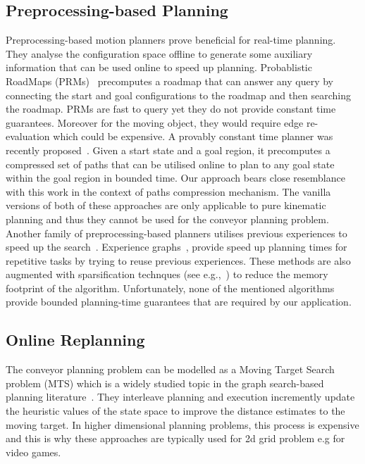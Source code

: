 \documentclass[conference]{IEEEtran}
\begin{document}
\subsection{Preprocessing-based Planning}
Preprocessing-based motion planners prove beneficial for real-time planning. They analyse the configuration space offline to generate some auxiliary information that can be used online to speed up planning. Probablistic RoadMaps (PRMs)~\cite{kavraki1996probabilistic} precomputes a roadmap that can answer any query by connecting the start and goal configurations to the roadmap and then searching the roadmap. PRMs are fast to query yet they do not provide constant time guarantees.
Moreover for the moving object, they would require edge re-evaluation which could be expensive.
%
A provably constant time planner was recently proposed~\cite{islam2019planning}. Given a start state and a goal region, it precomputes a compressed set of paths that can be utilised online to plan to any goal state within the goal region in bounded time. Our approach bears close resemblance with this work in the context of paths compression mechanism.
The vanilla versions of both of these approaches are only applicable to pure kinematic planning and thus they cannot be used for the conveyor planning problem.
%
Another family of preprocessing-based planners utilises previous experiences to speed up the search~\cite{PCCL12,BAG12,CSMOC15}. Experience graphs~\cite{PCCL12}, provide speed up planning times for repetitive tasks by trying to reuse previous experiences. These methods are also augmented with sparsification technques (see e.g.,~\cite{SSAH14,DB14}) to reduce the memory footprint of the algorithm.
Unfortunately, none of the mentioned algorithms provide bounded planning-time guarantees that are required by our application.

\subsection{Online Replanning}
The conveyor planning problem can be modelled as a Moving Target Search problem (MTS) which is a widely studied topic in the graph search-based planning literature~\cite{ishida1991moving,ishida1995moving,koenig2007speeding,koenig2007speeding,sun2010moving}. 
They interleave planning and execution incremently update the heuristic values of the state space to improve the distance estimates to the moving target. In higher dimensional planning problems, this process is expensive and this is why these approaches are typically used for 2d grid problem e.g for video games.
\end{document}
